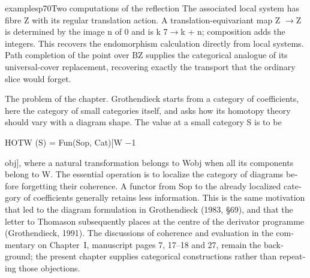 \begin{dcomment}{examples}{p70}{Two computations of the reflection}
The associated local system has fibre Z with its regular translation action. A translation-equivariant map Z \ensuremath{\to}Z is determined by the image n of 0 and is k 7\ensuremath{\to}k + n; composition adds the integers. This recovers the endomorphism calculation directly from local systems. Path completion of the point over BZ supplies the categorical analogue of its universal-cover replacement, recovering exactly the transport that the ordinary slice would forget.

\end{dcomment}
\begin{otherlanguage}{english}
The problem of the chapter. Grothendieck starts from a category of coefficients, here the category of small categories itself, and asks how its homotopy theory should vary with a diagram shape. The value at a small category S is to be


HOTW (S) = Fun(Sop, Cat)[W \ensuremath{-}1


obj], where a natural transformation belongs to Wobj when all its components belong to W. The essential operation is to localize the category of diagrams before forgetting their coherence. A functor from Sop to the already localized category of coefficients generally retains less information. This is the same motivation that led to the diagram formulation in Grothendieck (1983, \S{}69), and that the letter to Thomason subsequently places at the centre of the derivator programme (Grothendieck, 1991). The discussions of coherence and evaluation in the commentary on Chapter~I, manuscript pages 7, 17--18 and 27, remain the background; the present chapter supplies categorical constructions rather than repeating those objections.



\end{otherlanguage}
